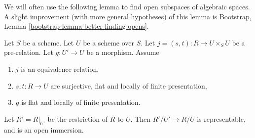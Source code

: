 \noindent
We will often use the following lemma to find open subspaces of algebraic
spaces. A slight improvement (with more general hypotheses) of this lemma is
Bootstrap, Lemma \ref{bootstrap-lemma-better-finding-opens}.

\begin{lemma}
\label{lemma-finding-opens}
Let $S$ be a scheme.
Let $U$ be a scheme over $S$.
Let $j = (s, t) : R \to U \times_S U$ be a pre-relation.
Let $g : U' \to U$ be a morphism.
Assume
\begin{enumerate}
\item $j$ is an equivalence relation,
\item $s, t : R \to U$ are surjective, flat and
locally of finite presentation,
\item $g$ is flat and locally of finite presentation.
\end{enumerate}
Let $R' = R|_{U'}$ be the restriction of $R$ to $U$. Then
$R'/U' \to R/U$ is representable, and is an open immersion.
\end{lemma}

